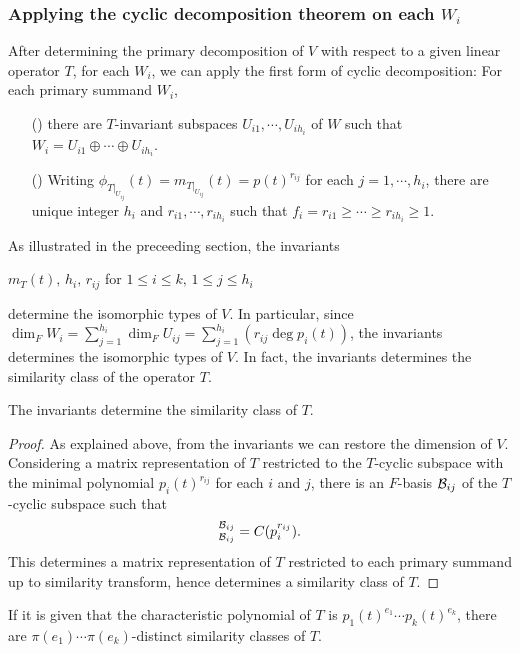 \subsubsection*{Applying the cyclic decomposition theorem on each $W_i$}
After determining the primary decomposition of $V$ with respect to a given linear operator $T$, for each $W_i$, we can apply the first form of cyclic decomposition: For each primary summand $W_i$,
\begin{enumerate}
    \item[(\romannumeral 1)]
    {
        there are $T$-invariant subspaces $U_{i 1}, \cdots, U_{i h_i}$ of $W$ such that $W_i = U_{i 1}\oplus\cdots\oplus U_{i h_i}$.
        }
    \item[(\romannumeral 2)]
    {
        Writing $\phi_{T|_{U_{i j}}}(t)=m_{T|_{U_{i j}}}(t)=p(t)^{r_{i j}}$ for each $j=1, \cdots, h_i$,  there are unique integer $h_i$ and $r_{i 1}, \cdots, r_{i h_i}$ such that $f_i=r_{i 1}\geq\cdots\geq r_{i h_i}\geq 1$.
    }
\end{enumerate}
As illustrated in the preceeding section, the invariants
\begin{center}
    $m_T(t),\,h_i,\,r_{ij}$ for $1\leq i\leq k,\,1\leq j\leq h_i$
\end{center}
determine the isomorphic types of $V$.
In particular, since $\dim_F W_i=\sum_{j=1}^{h_i}\dim_F U_{ij}=\sum_{j=1}^{h_i}(r_{ij}\deg p_i(t))$, the invariants determines the isomorphic types of $V$.
In fact, the invariants determines the similarity class of the operator $T$.
\begin{prop}
    The invariants determine the similarity class of $T$.
\end{prop}
\begin{proof}
    As explained above, from the invariants we can restore the dimension of $V$.
    Considering a matrix representation of $T$ restricted to the $T$-cyclic subspace with the minimal polynomial $p_i(t)^{r_{ij}}$ for each $i$ and $j$, there is an $F$-basis ${\mathcal{B}}_{i j}$ of the $T$-cyclic subspace such that
    \begin{align*}
        [T|_{U_{i j}}]^{\mc{B}_{i j}}_{\mc{B}_{i j}}=C(p_i^{r_{i j}}).
    \end{align*}
    This determines a matrix representation of $T$ restricted to each primary summand up to similarity transform, hence determines a similarity class of $T$.
\end{proof}
\begin{cor}
    If it is given that the characteristic polynomial of $T$ is $p_1(t)^{e_1}\cdots p_k(t)^{e_k}$, there are $\pi(e_1)\cdots\pi(e_k)$-distinct similarity classes of $T$.
\end{cor}

